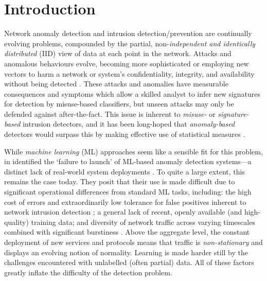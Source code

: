 \documentclass[10pt, times, comsoc]{IEEEtran}
\begin{document}
\section{Introduction}
Network anomaly detection and intrusion detection/prevention are continually evolving problems, compounded by the partial, non-\emph{independent and identically distributed} (IID) view of data at each point in the network.
Attacks and anomalous behaviours evolve, becoming more sophisticated or employing new vectors to harm a network or system's confidentiality, integrity, and availability without being detected \cite{DBLP:journals/comsur/BhuyanBK14}.
These attacks and anomalies have measurable consequences and symptoms which allow a skilled analyst to infer new signatures for detection by misuse-based classifiers, but unseen attacks may only be defended against after-the-fact.
This issue is inherent to \emph{misuse-} or \emph{signature-based} intrusion detectors, and it has been long-hoped that \emph{anomaly-based} detectors would surpass this by making effective use of statistical measures \cite{DBLP:journals/comsur/BhuyanBK14}.

While \emph{machine learning} (ML) approaches seem like a sensible fit for this problem, in \citeyear{DBLP:conf/sp/SommerP10} \citeauthor{DBLP:conf/sp/SommerP10} identified the `failure to launch' of ML-based anomaly detection systems---a distinct lack of real-world system deployments \cite{DBLP:conf/sp/SommerP10}.
To quite a large extent, this remains the case today.
They posit that their use is made difficult due to significant operational differences from standard ML tasks, including: the high cost of errors and extraordinarily low tolerance for false positives inherent to network intrusion detection \cite{DBLP:conf/ccs/Axelsson99}; a general lack of recent, openly available (and high-quality) training data; and diversity of network traffic across varying timescales combined with significant burstiness \cite{DBLP:journals/ccr/LelandWTW95}.
Above the aggregate level, the constant deployment of new services and protocols means that traffic is \emph{non-stationary} and displays an evolving notion of normality.
Learning is made harder still by the challenges encountered with unlabelled (often partial) data.
All of these factors greatly inflate the difficulty of the detection problem.

\end{document}
